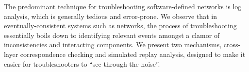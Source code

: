 The predominant technique for troubleshooting software-defined networks
is log analysis, which is generally tedious and error-prone. We observe that
in eventually-consistent systems such as networks, the process of troubleshooting
essentially boils down to identifying relevant events
amongst a clamor of inconsistencies and interacting components. We present two
mechanisms, cross-layer correspondence checking and simulated replay analysis, 
designed to make it easier for troubleshooters to ``see through the noise''.
